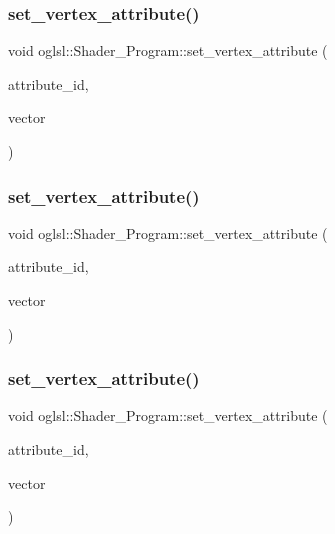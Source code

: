 \subsubsection{\texorpdfstring{set\+\_\+vertex\+\_\+attribute()}{set\_vertex\_attribute()}\hspace{0.1cm}{\footnotesize\ttfamily [2/4]}}
{\footnotesize\ttfamily void oglsl\+::\+Shader\+\_\+\+Program\+::set\+\_\+vertex\+\_\+attribute (\begin{DoxyParamCaption}\item[{G\+Lint}]{attribute\+\_\+id,  }\item[{const Vector2f \&}]{vector }\end{DoxyParamCaption})\hspace{0.3cm}{\ttfamily [inline]}}

\mbox{\label{classoglsl_1_1_shader___program_a95661ac1e32f6d3ffc1bfc81ce443e4a}} 
\subsubsection{\texorpdfstring{set\+\_\+vertex\+\_\+attribute()}{set\_vertex\_attribute()}\hspace{0.1cm}{\footnotesize\ttfamily [3/4]}}
{\footnotesize\ttfamily void oglsl\+::\+Shader\+\_\+\+Program\+::set\+\_\+vertex\+\_\+attribute (\begin{DoxyParamCaption}\item[{G\+Lint}]{attribute\+\_\+id,  }\item[{const Vector3f \&}]{vector }\end{DoxyParamCaption})\hspace{0.3cm}{\ttfamily [inline]}}

\mbox{\label{classoglsl_1_1_shader___program_a8e9053c1e6f9217ad9f12e245a0808a7}} 
\subsubsection{\texorpdfstring{set\+\_\+vertex\+\_\+attribute()}{set\_vertex\_attribute()}\hspace{0.1cm}{\footnotesize\ttfamily [4/4]}}
{\footnotesize\ttfamily void oglsl\+::\+Shader\+\_\+\+Program\+::set\+\_\+vertex\+\_\+attribute (\begin{DoxyParamCaption}\item[{G\+Lint}]{attribute\+\_\+id,  }\item[{const Vector4f \&}]{vector }\end{DoxyParamCaption})\hspace{0.3cm}{\ttfamily [inline]}}

